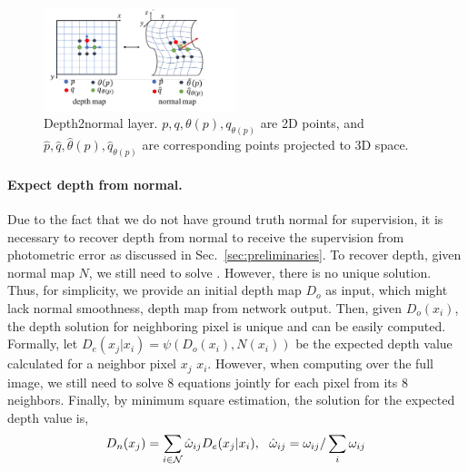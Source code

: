 
\begin{figure}
\centering
\includegraphics[width=0.5\textwidth]{figures/d2n.pdf}
\caption{Depth2normal layer. $p, q, \theta(p), q_{\theta(p)}$ are 2D points, and $\hat{p}, \hat{q}, \hat{\theta}(p), \hat{q}_{\theta(p)}$ are corresponding points projected to 3D space.}
\label{fig:d2n}
\end{figure}

\paragraph{Expect depth from normal.} 
Due to the fact that we do not have ground truth normal for supervision, it is necessary to recover depth from normal to receive the supervision from photometric error as discussed in Sec.~\ref{sec:preliminaries}.
To recover depth, given normal map $N$, we still need to solve . However, there is no unique solution. Thus, for simplicity, we provide an initial depth map $D_o$ as input, which might lack normal smoothness, \eg depth map from network output. Then, given $D_o(x_i)$, the depth solution for neighboring pixel is unique and can be easily computed. Formally, let $D_e(x_j | x_i) = \psi(D_o(x_i), N(x_i))$ be the expected depth value calculated for a neighbor pixel $x_j$ \wrt $x_i$. 
However, when computing over the full image, we still need to solve 8 equations jointly for each pixel from its 8 neighbors. Finally, by minimum square estimation, the solution for the expected depth value is,
\begin{align}
\label{eq:depth}
D_n(x_j) = \sum_{i\in{\mathcal N}}\hat{\omega}_{ij}D_e(x_j | x_i), \text{~~}
\hat{\omega}_{ij} = \omega_{ij} / \sum_i{\omega_{ij}}
\end{align}

